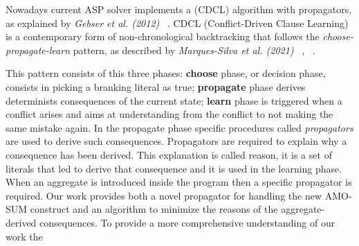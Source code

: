 
Nowadays current ASP solver implements a (CDCL) algorithm with propagators, 
as explained by \textit{Gebser et al. (2012)} ~\cite{DBLP:journals/ai/GebserKS12}.
CDCL (Conflict-Driven Clause Learning) is a contemporary form of non-chronological 
backtracking that follows the \textit{choose-propagate-learn} pattern, 
as described by \textit{Marques-Silva et al. (2021)} ~\cite{DBLP:series/faia/0001LM21}, ~\cite{DIMCAS}.

This pattern consists of this three phases: 
\textbf{choose} phase, or decision phase, consists in picking a branking literal as true; 
\textbf{propagate} phase derives determinists consequences of the current state;
\textbf{learn} phase is triggered when a conflict arises and aims at understanding from the conflict 
to not making the same mistake again.
In the propagate phase  specific procedures called \textit{propagators} are used to derive such consequences.
Propagators are required to explain why a consequence has been derived.
This explanation is called reason, it is a set of literals that led to derive that consequence 
and it is used in the learning phase.
When an aggregate is introduced inside the program then a specific propagator is required.
Our work provides both a novel propagator for handling the new AMO-SUM construct and 
an algorithm to minimize the reasons of the aggregate-derived consequences.
To provide a more comprehensive understanding of our work the 




